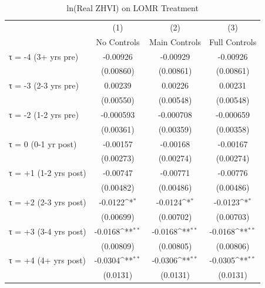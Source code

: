 \begin{table}[htbp]\centering
\def\sym#1{\ifmmode^{#1}\else\(^{#1}\)\fi}
\caption{ln(Real ZHVI) on LOMR Treatment}
\begin{tabular}{l*{3}{c}}
\hline\hline
                    &\multicolumn{1}{c}{(1)}&\multicolumn{1}{c}{(2)}&\multicolumn{1}{c}{(3)}\\
                    &\multicolumn{1}{c}{No Controls}&\multicolumn{1}{c}{Main Controls}&\multicolumn{1}{c}{Full Controls}\\
\hline
τ = -4 (3+ yrs pre) &    -0.00926         &    -0.00929         &    -0.00926         \\
                    &   (0.00860)         &   (0.00861)         &   (0.00861)         \\
[1em]
τ = -3 (2-3 yrs pre)&     0.00239         &     0.00226         &     0.00231         \\
                    &   (0.00550)         &   (0.00548)         &   (0.00548)         \\
[1em]
τ = -2 (1-2 yrs pre)&   -0.000593         &   -0.000708         &   -0.000659         \\
                    &   (0.00361)         &   (0.00359)         &   (0.00358)         \\
[1em]
τ = 0 (0-1 yr post) &    -0.00157         &    -0.00168         &    -0.00167         \\
                    &   (0.00273)         &   (0.00274)         &   (0.00274)         \\
[1em]
τ = +1 (1-2 yrs post)&    -0.00747         &    -0.00771         &    -0.00776         \\
                    &   (0.00482)         &   (0.00486)         &   (0.00486)         \\
[1em]
τ = +2 (2-3 yrs post)&     -0.0122\sym{*}  &     -0.0124\sym{*}  &     -0.0123\sym{*}  \\
                    &   (0.00699)         &   (0.00702)         &   (0.00703)         \\
[1em]
τ = +3 (3-4 yrs post)&     -0.0168\sym{**} &     -0.0168\sym{**} &     -0.0168\sym{**} \\
                    &   (0.00809)         &   (0.00805)         &   (0.00806)         \\
[1em]
τ = +4 (4+ yrs post)&     -0.0304\sym{**} &     -0.0306\sym{**} &     -0.0305\sym{**} \\
                    &    (0.0131)         &    (0.0131)         &    (0.0131)         \\

\end{tabular}
\end{table}
